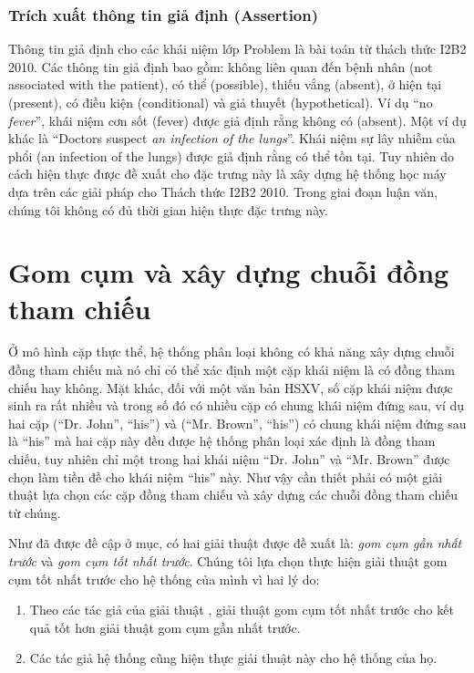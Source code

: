 \subsubsection*{Trích xuất thông tin giả định (Assertion)}
Thông tin giả định cho các khái niệm lớp Problem là bài toán từ thách thức I2B2 2010. Các thông tin giả định bao gồm: không liên quan đến bệnh nhân (not associated with the patient), có thể (possible), thiếu vắng (absent), ở hiện tại (present), có điều kiện (conditional) và giả thuyết (hypothetical). Ví dụ ``no \textit{fever}'', khái niệm cơn sốt (fever) được giả định rằng không có (absent). Một ví dụ khác là ``Doctors suspect \textit{an infection of the lungs}''. Khái niệm sự lây nhiễm của phổi (an infection of the lungs) được giả định rằng có thể tồn tại. Tuy nhiên do cách hiện thực được đề xuất cho đặc trưng này là xây dựng hệ thống học máy dựa trên các giải pháp cho Thách thức I2B2 2010. Trong giai đoạn luận văn, chúng tôi không có đủ thời gian hiện thực đặc trưng này.

\section{Gom cụm và xây dựng chuỗi đồng tham chiếu}
Ở mô hình cặp thực thể, hệ thống phân loại không có khả năng xây dựng chuỗi đồng tham chiếu mà nó chỉ có thể xác định một cặp khái niệm là có đồng tham chiếu hay không. Mặt khác, đối với một văn bản HSXV, số cặp khái niệm được sinh ra rất nhiều và trong số đó có nhiều cặp có chung khái niệm đứng sau, ví dụ hai cặp (“Dr. John”, “his”) và (“Mr. Brown”, “his”) có chung khái niệm đứng sau là “his” mà hai cặp này đều được hệ thống phân loại xác định là đồng tham chiếu, tuy nhiên chỉ một trong hai khái niệm “Dr. John” và “Mr. Brown” được chọn làm tiền đề cho khái niệm “his” này. Như vậy cần thiết phải có một giải thuật lựa chọn các cặp đồng tham chiếu và xây dựng các chuỗi đồng tham chiếu từ chúng.

Như đã được đề cập ở mục, có hai giải thuật được đề xuất là: \emph{gom cụm gần nhất trước} và \emph{gom cụm tốt nhất trước}. Chúng tôi lựa chọn thực hiện giải thuật gom cụm tốt nhất trước cho hệ thống của mình vì hai lý do:
\begin{enumerate}
\item Theo các tác giả của giải thuật \cite{VincentNg2002}, giải thuật gom cụm tốt nhất trước cho kết quả tốt hơn giải thuật gom cụm gần nhất trước.
\item Các tác giả hệ thống \cite{YanXu2012} cũng hiện thực giải thuật này cho hệ thống của họ.
\end{enumerate}

